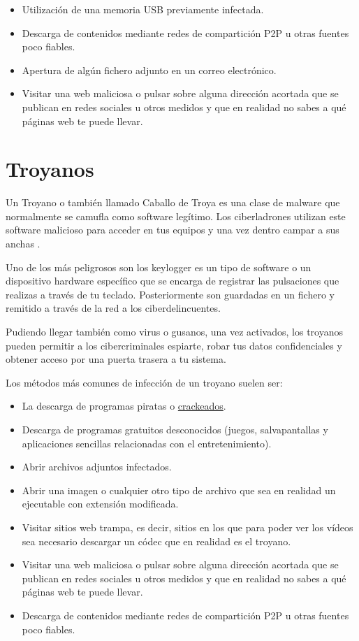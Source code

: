 \documentclass[
  a4paper,
  openany]{book}
\begin{document}
\begin{itemize}
\item
  Utilización de una memoria USB previamente infectada.
\item
  Descarga de contenidos mediante redes de compartición P2P u otras fuentes poco fiables.
\item
  Apertura de algún fichero adjunto en un correo electrónico.
\item
  Visitar una web maliciosa o pulsar sobre alguna dirección acortada que se publican en redes sociales u otros medidos y que en realidad no sabes a qué páginas web te puede llevar.
\end{itemize}

\hypertarget{troyanos}{%
\section{Troyanos}\label{troyanos}}

Un Troyano o también llamado Caballo de Troya es una clase de malware que normalmente se camufla como software legítimo. Los ciberladrones utilizan este software malicioso para acceder en tus equipos y una vez dentro campar a sus anchas \citep{KASPER-troyano}.

Uno de los más peligrosos son los keylogger es un tipo de software o un dispositivo hardware específico que se encarga de registrar las pulsaciones que realizas a través de tu teclado. Posteriormente son guardadas en un fichero y remitido a través de la red a los ciberdelincuentes.

Pudiendo llegar también como virus o gusanos, una vez activados, los troyanos pueden permitir a los cibercriminales espiarte, robar tus datos confidenciales y obtener acceso por una puerta trasera a tu sistema.

Los métodos más comunes de infección de un troyano suelen ser:

\begin{itemize}
\item
  La descarga de programas piratas o \href{https://es.wikipedia.org/wiki/Cracking_(software)}{crackeados}.
\item
  Descarga de programas gratuitos desconocidos (juegos, salvapantallas y aplicaciones sencillas relacionadas con el entretenimiento).
\item
  Abrir archivos adjuntos infectados.
\item
  Abrir una imagen o cualquier otro tipo de archivo que sea en realidad un ejecutable con extensión modificada.
\item
  Visitar sitios web trampa, es decir, sitios en los que para poder ver los vídeos sea necesario descargar un códec que en realidad es el troyano.
\item
  Visitar una web maliciosa o pulsar sobre alguna dirección acortada que se publican en redes sociales u otros medidos y que en realidad no sabes a qué páginas web te puede llevar.
\item
  Descarga de contenidos mediante redes de compartición P2P u otras fuentes poco fiables.
\end{itemize}
\end{document}
